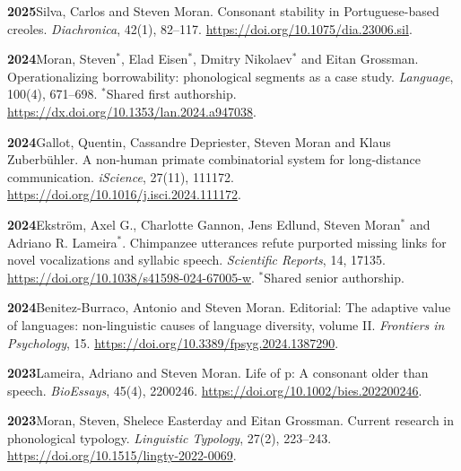 \documentclass[11pt]{article}
\newcommand{\hangpara}{
 \setlength{\parindent}{0in} %
 \hangindent=0.42in %
}
\begin{document}
\vskip 6pt
\hangpara
{\bf 2025}\hspace{1ex}Silva, Carlos and Steven Moran. Consonant stability in Portuguese-based creoles. \textit{Diachronica}, 42(1), 82--117. \url{https://doi.org/10.1075/dia.23006.sil}.

\vskip 6pt
\hangpara
{\bf 2024}\hspace{1ex}Moran, Steven$^*$, Elad Eisen$^*$, Dmitry Nikolaev$^*$ and Eitan Grossman. Operationalizing borrowability: phonological segments as a case study. \textit{Language}, 100(4), 671--698. $^*$Shared first authorship. \url{https://dx.doi.org/10.1353/lan.2024.a947038}.%

\vskip 6pt
\hangpara
{\bf 2024}\hspace{1ex}Gallot, Quentin, Cassandre Depriester, Steven Moran and Klaus Zuberbühler. A non-human primate combinatorial system for long-distance communication. \textit{iScience}, 27(11), 111172. \url{https://doi.org/10.1016/j.isci.2024.111172}.

\vskip 6pt
\hangpara
{\bf 2024}\hspace{1ex}Ekström, Axel G., Charlotte Gannon, Jens Edlund, Steven Moran$^*$ and Adriano R. Lameira$^*$. Chimpanzee utterances refute purported missing links for novel vocalizations and syllabic speech. \textit{Scientific Reports}, 14, 17135. \url{https://doi.org/10.1038/s41598-024-67005-w}. $^*$Shared senior authorship.

\vskip 6pt
\hangpara
{\bf 2024}\hspace{1ex}Benitez-Burraco, Antonio and Steven Moran. Editorial: The adaptive value of languages: non-linguistic causes of language diversity, volume II. \textit{Frontiers in Psychology}, 15. \url{https://doi.org/10.3389/fpsyg.2024.1387290}.

\vskip 6pt
\hangpara
{\bf 2023}\hspace{1ex}Lameira, Adriano and Steven Moran. Life of p: A consonant older than speech. \textit{BioEssays}, 45(4), 2200246. \url{https://doi.org/10.1002/bies.202200246}.

\hangpara
\vskip 6pt
{\bf 2023}\hspace{1ex}Moran, Steven, Shelece Easterday and Eitan Grossman. Current research in phonological typology. \textit{Linguistic Typology}, 27(2), 223--243. \url{https://doi.org/10.1515/lingty-2022-0069}.
\end{document}
